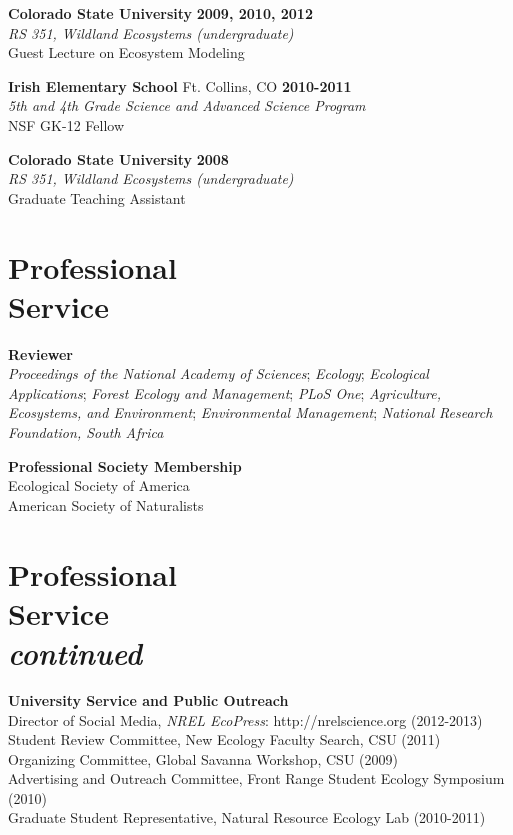 \documentclass[margin,line]{resume}
\begin{document}
\begin{resume}
    \textbf{Colorado State University} \hfill \textbf{2009, 2010, 2012}\\ 
               \textsl{RS 351, Wildland Ecosystems (undergraduate)}\\
               Guest Lecture on Ecosystem Modeling
               
    \textbf{Irish Elementary School} Ft. Collins, CO \hfill \textbf{2010-2011}\\ 
   		\textsl{5th and 4th Grade Science and Advanced Science Program}\\
		NSF GK-12 Fellow
		
     \textbf{Colorado State University} \hfill \textbf{2008}\\ 
               \textsl{RS 351, Wildland Ecosystems (undergraduate)}\\
               Graduate Teaching Assistant 

    \section{\mysidestyle Professional\\Service}
    \textbf{Reviewer}\\
    	\textsl{Proceedings of the National Academy of Sciences};
	\textsl{Ecology};
	\textsl{Ecological Applications};
	\textsl{Forest Ecology and Management};
	\textsl{PLoS One};
	\textsl{Agriculture, Ecosystems, and Environment};
	\textsl{Environmental Management};
	\textsl{National Research Foundation, South Africa}
	

 \textbf{Professional Society Membership}\\
    	Ecological Society of America\\
	American Society of Naturalists

  \newpage
\section{\mysidestyle Professional\\Service\\ \textsl{\footnotesize continued}}
   \textbf{University Service and Public Outreach}\\
   	Director of Social Media, \textsl{NREL EcoPress}: http://nrelscience.org (2012-2013)\\
	Student Review Committee, New Ecology Faculty Search, CSU (2011)\\
	Organizing Committee, Global Savanna Workshop, CSU (2009)\\
	Advertising and Outreach Committee, Front Range Student Ecology Symposium (2010)\\
	Graduate Student Representative, Natural Resource Ecology Lab (2010-2011)
  

\end{resume}
\end{document}
